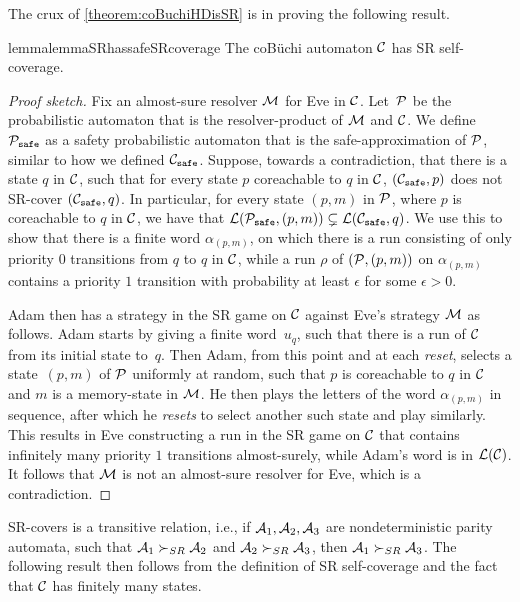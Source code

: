 The crux of \cref{theorem:coBuchiHDisSR} is in proving the following result.
\begin{restatable}{lemma}{lemmaSRhassafeSRcoverage}\label{lemma:coBuchiSRhassafeSRcoverage}
The coB\"uchi automaton $\mathcal{C}$  has SR self-coverage.
\end{restatable}
\begin{proof}[Proof sketch] Fix an almost-sure resolver $\mathcal{M}$ for Eve in $\mathcal{C}$. Let~$\mathcal{P}$ be the probabilistic automaton that is the resolver-product of $\mathcal{M}$ and $\mathcal{C}$. We define $\mathcal{P}_{\texttt{safe}}$ as a safety probabilistic automaton that is the safe-approximation of $\mathcal{P}$, similar to how we defined $\mathcal{C}_{\texttt{safe}}$. Suppose, towards a contradiction, that there is a state $q$ in $\mathcal{C}$, such that for every state $p$ coreachable to $q$ in $\mathcal{C}$, $(\mathcal{C}_{\texttt{safe}},p)$ does not SR-cover $(\mathcal{C}_{\texttt{safe}},q)$. In particular, for every state $(p,m)$ in $\mathcal{P}$, where $p$ is coreachable to $q$ in $\mathcal{C}$, we have that $\mathcal{L}(\mathcal{P}_{\texttt{safe}},(p,m)) \subsetneq \mathcal{L}(\mathcal{C}_{\texttt{safe}},q)$. We use this to show that there is a finite word $\alpha_{(p,m)}$, on which there is a run consisting of only priority 0 transitions from $q$ to $q$ in $\mathcal{C}$, while a run $\rho$ of $(\mathcal{P},(p,m))$ on $\alpha_{(p,m)}$ contains a priority $1$ transition with probability at least $\epsilon$ for some $\epsilon>0$.    

Adam then has a strategy in the SR game on $\mathcal{C}$ against Eve's strategy $\mathcal{M}$ as follows. Adam starts by giving a finite word~$u_q$, such that there is a run of $\mathcal{C}$ from its  initial state to~$q$. Then Adam, from this point and at each \emph{reset}, selects a state~$(p,m)$ of $\mathcal{P}$ uniformly at random, such that $p$ is coreachable to $q$ in $\mathcal{C}$ and $m$ is a memory-state in $\mathcal{M}$. He then plays the letters of the word $\alpha_{(p,m)}$ in sequence, after which he \emph{resets} to select another such state and play similarly. This results in Eve constructing a run in the SR game on $\mathcal{C}$ that contains infinitely many priority $1$ transitions almost-surely, while Adam's word is in $\mathcal{L}(\mathcal{C})$. It follows that $\mathcal{M}$ is not an almost-sure resolver for Eve, which is a contradiction.
\end{proof}

 SR-covers is a transitive relation, i.e., if $\mathcal{A}_1,\mathcal{A}_2,\mathcal{A}_3$ are nondeterministic parity automata, such that $\mathcal{A}_1 \succ_{SR} \mathcal{A}_2$ and $\mathcal{A}_2 \succ_{SR} \mathcal{A}_3$, then $\mathcal{A}_1 \succ_{SR} \mathcal{A}_3$. The following result then follows from the definition of SR self-coverage and the fact that $\mathcal{C}$ has finitely many states.%

